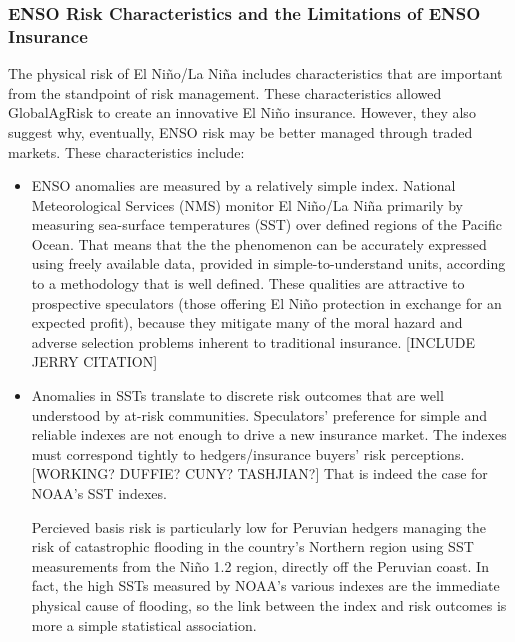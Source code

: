 \documentclass[authoryear]{article}
\begin{document}
\subsubsection{ENSO Risk Characteristics and the Limitations of ENSO Insurance}
The physical risk of El Ni\~no/La Ni\~na includes characteristics that are important from the standpoint of risk management. These characteristics allowed GlobalAgRisk to create an innovative El Ni\~no insurance. However, they also suggest why, eventually, ENSO risk may be better managed through traded markets. These characteristics include:
\begin{itemize}
\item ENSO anomalies are measured by a relatively simple index.
National Meteorological Services (NMS) monitor El Ni\~no/La Ni\~na primarily by measuring sea-surface temperatures (SST) over defined regions of the Pacific Ocean. That means that the the phenomenon can be accurately expressed using freely available data, provided in simple-to-understand units, according to a methodology that is well defined. These qualities are attractive to prospective speculators (those offering El Ni\~no protection in exchange for an expected profit), because they mitigate many of the moral hazard and adverse selection problems inherent to traditional insurance. [INCLUDE JERRY CITATION] 
\item Anomalies in SSTs translate to discrete risk outcomes that are well understood by at-risk communities.
Speculators' preference for simple and reliable indexes are not enough to drive a new insurance market. The indexes must correspond tightly to hedgers/insurance buyers' risk perceptions.[WORKING? DUFFIE? CUNY? TASHJIAN?] That is indeed the case for NOAA's SST indexes. 

Percieved basis risk is particularly low for Peruvian hedgers managing the risk of catastrophic flooding in the country's Northern region using SST measurements from the Ni\~no 1.2 region, directly off the Peruvian coast. In fact, the high SSTs measured by NOAA's various indexes are the immediate physical cause of flooding, so the link between the index and risk outcomes is more a simple statistical association\cite{khalil2007nino}. 


\end{itemize}
\end{document}
